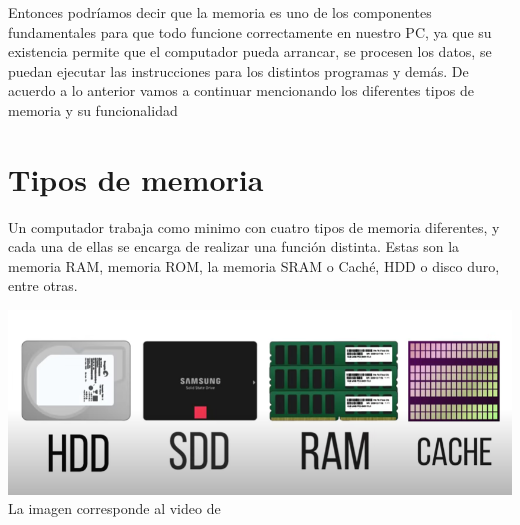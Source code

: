 \documentclass[12pt,oneside]{book}
\begin{document}
Entonces podríamos decir que la memoria  es uno de los componentes fundamentales para que todo funcione correctamente en nuestro PC, ya que su existencia permite que el computador pueda arrancar, se procesen los datos, se puedan ejecutar las instrucciones para los distintos programas y demás. De acuerdo a lo anterior vamos a continuar mencionando los diferentes tipos de memoria y su funcionalidad


\section{Tipos de memoria}
Un computador trabaja como minimo con cuatro tipos de memoria diferentes, y cada una de ellas se encarga de realizar una función distinta. Estas son la memoria RAM, memoria ROM, la memoria SRAM o Caché, HDD o disco duro, entre otras.

 \includegraphics[width=1.00\textwidth]{MEMORIAS.PNG}
  La imagen corresponde al video de  \cite{memoria}
 \newpage
 
\end{document}
